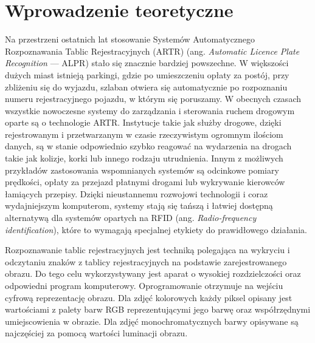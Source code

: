 %


\chapter{Wprowadzenie teoretyczne}\label{ch:wprowadzenie-teoretyczne}

Na przestrzeni ostatnich lat stosowanie Systemów Automatycznego Rozpoznawania Tablic Rejestracyjnych (ARTR) (ang. \textit{Automatic Licence Plate Recognition} --- ALPR) stało się znacznie bardziej powszechne.
W większości dużych miast istnieją parkingi, gdzie po umieszczeniu opłaty za postój, przy zbliżeniu się do wyjazdu, szlaban otwiera się automatycznie po rozpoznaniu numeru rejestracyjnego pojazdu, w którym się poruszamy.
W obecnych czasach wszystkie nowoczesne systemy do zarządzania i sterowania ruchem drogowym oparte są o technologie ARTR.
Instytucje takie jak służby drogowe, dzięki rejestrowanym i przetwarzanym w czasie rzeczywistym ogromnym ilościom danych, są \linebreak w stanie odpowiednio szybko reagować na wydarzenia na drogach takie jak kolizje, korki lub innego rodzaju utrudnienia.
Innym z możliwych przykładów zastosowania wspomnianych systemów są odcinkowe pomiary prędkości, opłaty za przejazd płatnymi drogami lub wykrywanie kierowców łamiących przepisy.
Dzięki nieustannemu rozwojowi technologii i coraz wydajniejszym komputerom, systemy stają się tańszą i łatwiej dostępną alternatywą dla systemów opartych na RFID (ang. \textit{Radio-frequency identification}), które to wymagają specjalnej etykiety do prawidłowego działania.

Rozpoznawanie tablic rejestracyjnych jest techniką polegająca na wykryciu i odczytaniu znaków z tablicy rejestracyjnych na podstawie zarejestrowanego obrazu.
Do tego celu wykorzystywany jest aparat o wysokiej rozdzielczości oraz odpowiedni program komputerowy.
Oprogramowanie otrzymuje na wejściu cyfrową reprezentację obrazu.
Dla zdjęć kolorowych każdy piksel opisany jest wartościami z palety barw RGB reprezentującymi jego barwę oraz współrzędnymi umiejscowienia w obrazie.
Dla zdjęć monochromatycznych barwy opisywane są najczęściej za pomocą wartości luminacji obrazu.

